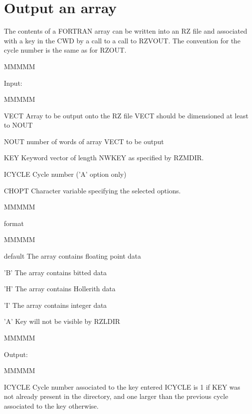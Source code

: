 \section{Output an array}
\par The contents of a FORTRAN array can be written
into an RZ file and associated with a key in the CWD
by a call to a call to RZVOUT.
The convention for the cycle number is the same as for RZOUT.
\begin{DL}{MMMMM}
\item[Input:
]
\begin{DL}{MMMMM}
\item[VECT
]Array to be output onto the RZ file
\newline VECT should be dimensioned at least to NOUT
\item[NOUT
]number of words of array VECT to be output
\item[KEY
]Keyword vector of length NWKEY as specified by RZMDIR.
\item[ICYCLE
]Cycle number ('A' option only)
\item[CHOPT
]Character variable specifying the selected options.
\begin{DL}{MMMMM}
\item[format
]
\begin{DL}{MMMMM}
\item[default
]The array contains floating point data
\item['B'
]The array contains bitted data
\item['H'
]The array contains Hollerith data
\item['I'
]The array contains integer data
\item['A'
]Key will not be visible by RZLDIR
\end{DL}
\end{DL}
\end{DL}
\end{DL}
\begin{DL}{MMMMM}
\item[Output:
]
\begin{DL}{MMMMM}
\item[ICYCLE
]Cycle number associated to the key entered
\newline ICYCLE is 1 if KEY was not already present in the directory, and
one larger than the previous cycle associated to the key otherwise.
\end{DL}
\end{DL}
